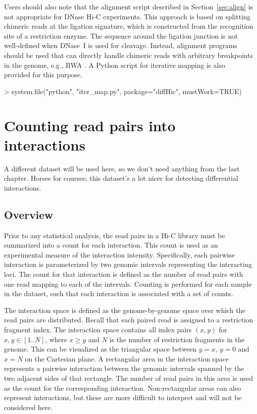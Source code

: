 \documentclass[12pt]{report}
\renewenvironment{Schunk}{\vspace{0pt}}{\vspace{0pt}}
\newenvironment{combox}
{ \begin{shaded}\begin{center}\begin{minipage}[t]{0.95\textwidth} }
{ \end{minipage}\end{center}\end{shaded} }
\begin{document}
Users should also note that the alignment script described in Section~\ref{sec:align} is not appropriate for DNase Hi-C experiments.
This approach is based on splitting chimeric reads at the ligation signature, which is constructed from the recognition site of a restriction enzyme.
The sequence around the ligation junction is not well-defined when DNase~I is used for cleavage.
Instead, alignment programs should be used that can directly handle chimeric reads with arbitrary breakpoints in the genome, e.g., BWA \citep{li2010fast}.
A Python script for iterative mapping \citep{imakaev2012iterative} is also provided for this purpose.

\begin{Schunk}
\begin{Sinput}
> system.file("python", "iter_map.py", package="diffHic", mustWork=TRUE)
\end{Sinput}
\end{Schunk}


\chapter{Counting read pairs into interactions}
\label{chap:counting}

\begin{combox}
A different dataset will be used here, so we don't need anything from the last chapter.
Horses for courses; this dataset's a lot nicer for detecting differential interactions.
\end{combox}

\section{Overview}
Prior to any statistical analysis, the read pairs in a Hi-C library must be summarized into a count for each interaction.
This count is used as an experimental measure of the interaction intensity.
Specifically, each pairwise interaction is parameterized by two genomic intervals representing the interacting loci.
The count for that interaction is defined as the number of read pairs with one read mapping to each of the intervals.
Counting is performed for each sample in the dataset, such that each interaction is associated with a set of counts.

The interaction space is defined as the genome-by-genome space over which the read pairs are distributed.
Recall that each paired read is assigned to a restriction fragment index.
The interaction space contains all index pairs $(x, y)$ for $x, y \in [1 .. N]$, where $x \ge y$ and $N$ is the number of restriction fragments in the genome.
This can be visualized as the triangular space between $y=x$, $y=0$ and $x=N$ on the Cartesian plane.
A rectangular area in the interaction space represents a pairwise interaction between the genomic intervals spanned by the two adjacent sides of that rectangle.
The number of read pairs in this area is used as the count for the corresponding interaction.
Non-rectangular areas can also represent interactions, but these are more difficult to interpret and will not be considered here.
\end{document}
